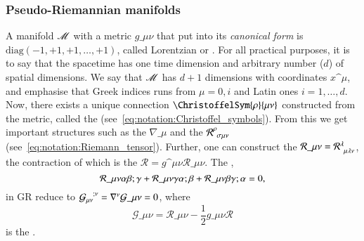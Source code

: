 \subsubsection{Pseudo-Riemannian manifolds}
A manifold $\mathscr{M}$ with a metric $g\_{\mu\nu}$ that put into its \emph{canonical form} is $\text{diag}(-1,+1,+1, \dots,+1)$,  called Lorentzian or . For all practical purposes, it is to say that the spacetime has one time dimension and arbitrary number ($d$) of spatial dimensions. We say that $\mathscr{M}$ has $d+1$ dimensions with coordinates $x\^\mu$, and emphasise that Greek indices runs from $\mu=0,i$ and Latin ones $i = 1, \dots , d$. Now, there exists a unique connection $\ChristoffelSym{\rho}{\mu\nu}$ constructed from the metric, called the  (see~\cref{eq:notation:Christoffel_symbols}). From this we get important structures such as the  $\nabla\_\mu$ and the  $\mathcal{R}\indices{^\rho_{\sigma\mu\nu}}$ (see~\cref{eq:notation:Riemann_tensor}). Further, one can construct the  $\mathcal{R}\_{\mu\nu}  = \mathcal{R}\indices{^\lambda_{\mu\lambda\nu}}$, 
the contraction of which is the  $\mathcal{R}= g\^{\mu\nu} \mathcal{R}\_{\mu\nu}$. 
The ,~\citep{carrollSpacetimeGeometryIntroduction2019}
\begin{equation}\label{eq:GR:diffgeo:Bianchi_identities}
    \mathcal{R}\_{\mu\nu\alpha\beta;\gamma} + 
    \mathcal{R}\_{\mu\nu\gamma\alpha;\beta} + 
    \mathcal{R}\_{\mu\nu\beta\gamma;\alpha} = 0,
\end{equation}
in GR reduce to %
$\mathcal{G}\indices{_{\mu\nu}^{;\nu}}= \nabla\^\nu \mathcal{G}\_{\mu\nu}= 0$, where %
\begin{equation}\label{eq:GR:diffgeo:Einstein_tensor}
    \mathcal{G}\_{\mu\nu}= \mathcal{R}\_{\mu\nu} - \frac{1}{2} g\_{\mu\nu}  \mathcal{R}
\end{equation}
is the . 




